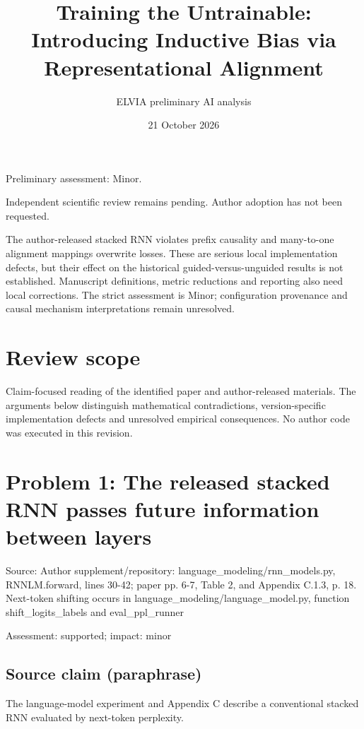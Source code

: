 \documentclass[11pt]{article}
\begin{document}
\title{Training the Untrainable: Introducing Inductive Bias via Representational Alignment}

\author{ELVIA preliminary AI analysis}\date{21 October 2026}\maketitle

Preliminary assessment: Minor.\par

Independent scientific review remains pending. Author adoption has not been requested.

The author-released stacked RNN violates prefix causality and many-to-one alignment mappings overwrite losses. These are serious local implementation defects, but their effect on the historical guided-versus-unguided results is not established. Manuscript definitions, metric reductions and reporting also need local corrections. The strict assessment is Minor; configuration provenance and causal mechanism interpretations remain unresolved.

\section*{Review scope}

Claim-focused reading of the identified paper and author-released materials. The arguments below distinguish mathematical contradictions, version-specific implementation defects and unresolved empirical consequences. No author code was executed in this revision.

\section*{Problem 1: The released stacked RNN passes future information between layers}

Source: Author supplement/repository: language\_modeling/rnn\_models.py, RNNLM.forward, lines 30-42; paper pp. 6-7, Table 2, and Appendix C.1.3, p. 18. Next-token shifting occurs in language\_modeling/language\_model.py, function shift\_logits\_labels and eval\_ppl\_runner

Assessment: supported; impact: minor

\subsection*{Source claim (paraphrase)}

The language-model experiment and Appendix C describe a conventional stacked RNN evaluated by next-token perplexity.
\end{document}

